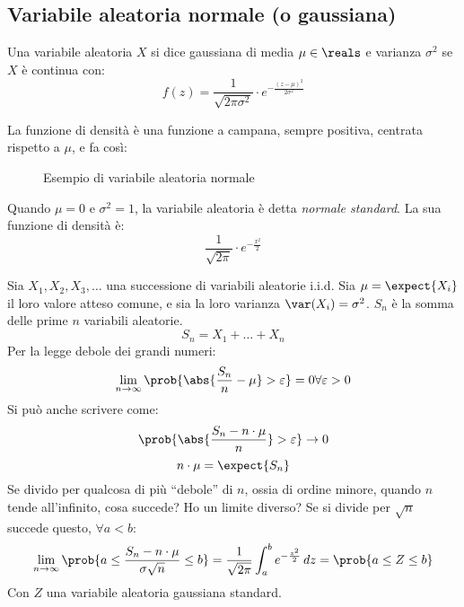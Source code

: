 \subsection{Variabile aleatoria normale (o gaussiana)}

\begin{defn}
Una variabile aleatoria $X$ si dice gaussiana di media $\mu \in \reals$ e varianza $\sigma^2$ se $X$ \`e continua con:
\[
f(z) = \frac{1}{\sqrt{2 \pi \sigma^2}} \cdot e^{-\frac{(z - \mu)^2}{2 \sigma^2}}
\]
\end{defn}

La funzione di densit\`a \`e una funzione a campana, sempre positiva, centrata rispetto a $\mu$, e fa cos\`i:


\begin{figure}[ht]
\centering
{}
\caption{Esempio di variabile aleatoria normale}
\end{figure}

Quando $\mu = 0$ e $\sigma^2 = 1$, la variabile aleatoria \`e detta \emph{normale standard}. La sua funzione di densit\`a \`e:
\[
\frac{1}{\sqrt{2 \pi}} \cdot e^{-\frac{x^2}{2}}
\]
\begin{theorem}
Sia $X_1, X_2, X_3, \ldots$ una successione di variabili aleatorie i.i.d. Sia $\mu = \expect{X_i}$ il loro valore atteso comune, e sia la loro varianza $\var(X_i) = \sigma^2$. $S_n$ \`e la somma delle prime $n$ variabili aleatorie.
\[
S_n = X_1 + \ldots + X_n
\]
Per la legge debole dei grandi numeri:
\[
\lim_{n \to \infty} \prob{ \abs{ \frac{S_n}{n} - \mu} > \varepsilon} = 0 \forall \varepsilon > 0
\]
Si pu\`o anche scrivere come:
\[
\prob{ \abs{\frac{S_n - n \cdot \mu}{n}} > \varepsilon} \to 0
\]
\[
n \cdot \mu = \expect{S_n}
\]
Se divido per qualcosa di pi\`u ``debole'' di $n$, ossia di ordine minore, quando $n$ tende all'infinito, cosa succede? Ho un limite diverso? Se si divide per $\sqrt{n}$ succede questo, $\forall a < b$:
\[
\lim_{n \to \infty} 
\prob{a \le \frac{S_n - n \cdot \mu}{\sigma \sqrt{n}} \le b} = 
\frac{1}{\sqrt{2 \pi}} \int_{a}^{b} e^{-\frac{z^2}{2}} \, dz = 
\prob{a \le Z \le b}
\]
Con $Z$ una variabile aleatoria gaussiana standard.
\end{theorem}

